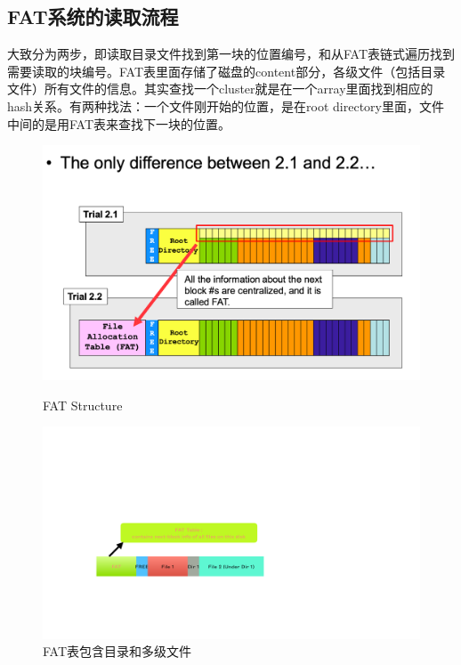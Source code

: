 \documentclass[]{report}
\begin{document}
		\subsection{FAT系统的读取流程}
		大致分为两步，即读取目录文件找到第一块的位置编号，和从FAT表链式遍历找到需要读取的块编号。FAT表里面存储了磁盘的content部分，各级文件（包括目录文件）所有文件的信息。其实查找一个cluster就是在一个array里面找到相应的hash关系。有两种找法：一个文件刚开始的位置，是在root directory里面，文件中间的是用FAT表来查找下一块的位置。\par
		\begin{figure}[h]
			\centering
			\begin{minipage}{20em}
				\centering
				\includegraphics[scale = 0.15]{images/FAT.png}
				\caption{FAT Structure}
			\end{minipage}
			\begin{minipage}{20em}
				\centering
				\begin{minipage}{20em}
					\centering
					\includegraphics[scale = 0.18]{images/FAT_Explain_1.pdf}
					\caption{FAT表包含目录和多级文件}

\end{minipage}
\end{minipage}
\end{figure}
\end{document}
